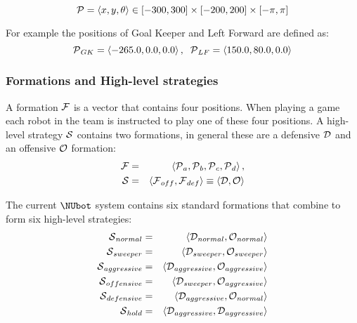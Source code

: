 \begin{equation*}
\Position = \left\langle x, y, \theta \right\rangle \in [-300,300]\times[-200,200]\times[-\pi,\pi]
\end{equation*}

For example the positions of Goal Keeper and Left Forward are
defined as:
\begin{equation*}
\Position_{GK} = \left\langle -265.0, 0.0, 0.0 \right\rangle, \;\;
\Position_{LF} = \left\langle 150.0, 80.0, 0.0 \right\rangle
\end{equation*}

\subsubsection{Formations and High-level strategies}
\label{subsec:formations}

A formation $\Formation$ is a vector that contains four positions.
When playing a game each robot in the team is instructed to play one
of these four positions. A high-level strategy $\Highlevel$
contains two formations, in general these are a defensive
$\FormationDef$ and an offensive $\FormationOff$ formation:
\begin{eqnarray*}
\Formation &=& \left\langle \Position_{a}, \Position_{b}, \Position_{c}, \Position_{d} \right\rangle , \\
\Highlevel &=& \left\langle \Formation_{off}, \Formation_{def} \right\rangle
                     \equiv \left\langle \FormationDef, \FormationOff \right\rangle
\end{eqnarray*}

The current $\NUbot$ system contains six standard formations that
combine to form six high-level strategies:
\begin{eqnarray*}
\Highlevel_{normal} &=& \left\langle \FormationDef_{normal}, \FormationOff_{normal} \right\rangle \\
\Highlevel_{sweeper} &=& \left\langle \FormationDef_{sweeper}, \FormationOff_{sweeper} \right\rangle \\
\Highlevel_{aggressive} &=& \left\langle \FormationDef_{aggressive}, \FormationOff_{aggressive} \right\rangle \\
\Highlevel_{offensive} &=& \left\langle \FormationDef_{sweeper}, \FormationOff_{aggressive} \right\rangle \\
\Highlevel_{defensive} &=& \left\langle \FormationDef_{aggressive}, \FormationOff_{normal} \right\rangle \\
\Highlevel_{hold} &=& \left\langle \FormationDef_{aggressive},\FormationDef_{aggressive} \right\rangle
\end{eqnarray*}

